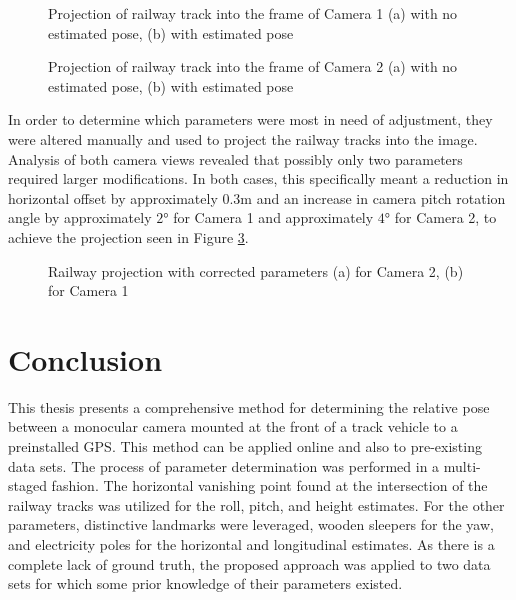 \begin{figure}[h]
    \centering
    \caption{Projection of railway track into the frame of Camera 1 (a) with no estimated pose, (b) with estimated pose}
    \label{pics:proj_cam0}
\end{figure}

\begin{figure}[h]
    \centering
    \caption{Projection of railway track into the frame of Camera 2 (a) with no estimated pose, (b) with estimated pose}
    \label{pics:proj_cam1}
\end{figure}




\newpage
In order to determine which parameters were most in need of adjustment, they were altered manually and used to project the railway tracks into the image. Analysis of both camera views revealed that possibly only two parameters required larger modifications. In both cases, this specifically meant a reduction in horizontal offset by approximately $0.3$m and an increase in camera pitch rotation angle by approximately $2$° for Camera 1 and approximately $4$° for Camera 2, to achieve the projection seen in Figure \ref{pics:correct_proj}.

\begin{figure}[h]
    \centering
    \caption{Railway projection with corrected parameters (a) for Camera 2, (b) for Camera 1}
    \label{pics:correct_proj}
\end{figure}





\newpage
\chapter{Conclusion}

This thesis presents a comprehensive method for determining the relative pose between a monocular camera mounted at the front of a track vehicle to a preinstalled GPS. This method can be applied online and also to pre-existing data sets. The process of parameter determination was performed in a multi-staged fashion. The horizontal vanishing point found at the intersection of the railway tracks was utilized for the roll, pitch, and height estimates. For the other parameters, distinctive landmarks were leveraged, wooden sleepers for the yaw, and electricity poles for the horizontal and longitudinal estimates. As there is a complete lack of ground truth, the proposed approach was applied to two data sets for which some prior knowledge of their parameters existed. \\

